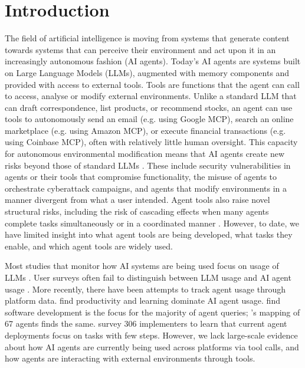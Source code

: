 \documentclass[manuscript,screen,nonacm,oneside]{acmart}
\begin{document}

\maketitle

\section{Introduction}
\label{sec:introduction}

The field of artificial intelligence is moving from systems that generate content towards systems that can perceive their environment and act upon it \citep{russell2020artificial} in an increasingly autonomous fashion (AI agents).
Today's AI agents are systems built on Large Language Models (LLMs), augmented with memory components and provided with access to external tools.
Tools are functions that the agent can call to access, analyse or modify external environments. Unlike a standard LLM that can draft correspondence, list products, or recommend stocks, an agent can use tools to autonomously send an email (e.g. using Google MCP), search an online marketplace (e.g. using Amazon MCP), or execute financial transactions (e.g. using Coinbase MCP), often with relatively little human oversight. This capacity for autonomous environmental modification means that AI agents create new risks beyond those of standard LLMs \citep{cihon2025measuring}. These include security vulnerabilities in agents or their tools that compromise functionality, the misuse of agents to orchestrate cyberattack campaigns, and agents that modify environments in a manner divergent from what a user intended. Agent tools also raise novel structural risks, including the risk of cascading effects when many agents complete tasks simultaneously or in a coordinated manner \citep{ALDASORO2025101472,danielsson2025artificialintelligencefinancialcrises}. However, to date, we have limited insight into what agent tools are being developed, what tasks they enable, and which agent tools are widely used.

Most studies that monitor how AI systems are being used focus on usage of LLMs \citep{chatterji2025people,handa2025which}. User surveys often fail to distinguish between LLM usage and AI agent usage \citep{hai2025aiindex,googleRealworldCases,pwc2024agents}. More recently, there have been attempts to track agent usage through platform data. \citep{yang2025adoption} find productivity and learning dominate AI agent usage. \citep{aubakirova2025state} find software development is the focus for the majority of agent queries; \citep{casper2025agent}'s mapping of 67 agents finds the same. \citep{pan2025measuring} survey 306 implementers to learn that current agent deployments focus on tasks with few steps. However, we lack large-scale evidence about how AI agents are currently being used across platforms via tool calls, and how agents are interacting with external environments through tools. 
\end{document}
